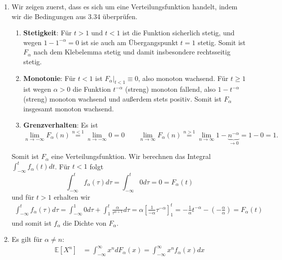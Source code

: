\documentclass{article}
\def\to{\ensuremath{\rightarrow}} %
\begin{document}
\begin{enumerate}[label=(\alph*)]
	\item Wir zeigen zuerst, dass es sich um eine Verteilungsfunktion handelt, indem wir die Bedingungen aus 3.34 überprüfen.
	      \begin{enumerate}
		      \item \textbf{Stetigkeit}: Für $t > 1$ und $t < 1$ ist die Funktion sicherlich stetig, und wegen $1 - 1^{-\alpha}=0$ ist sie auch am Übergangspunkt $t = 1$ stetig. Somit ist $F_\alpha$ nach dem Klebelemma stetig und damit insbesondere rechtsseitig stetig.
		      \item \textbf{Monotonie}: Für $t < 1$ ist $F_\alpha|_{t < 1} \equiv 0$, also monoton wachsend. Für $t \geq 1$ ist wegen $\alpha > 0$ die Funktion $t^{-\alpha}$ (streng) monoton fallend, also $1 - t^{-\alpha}$ (streng) monoton wachsend und außerdem stets positiv. Somit ist $F_\alpha$ insgesamt monoton wachsend.
		      \item \textbf{Grenzverhalten}: Es ist
		            \begin{equation*}
			            \lim_{n \to -\infty} F_\alpha(n) \overset{n < 1}{=} \lim_{n \to -\infty} 0 = 0 \qquad \lim_{n \to \infty} F_\alpha(n) \overset{n > 1}{=} \lim_{n \to \infty} 1 - \underbrace{n^{-\alpha}}_{\to 0} = 1 - 0 = 1\text{.}
		            \end{equation*}
	      \end{enumerate}
	      Somit ist $F_\alpha$ eine Verteilungsfunktion. Wir berechnen das Integral $\int_{-\infty}^{t} f_\alpha(t) dt$. Für $t < 1$ folgt
	      \begin{equation*}
		      \int_{-\infty}^{t} f_\alpha(\tau) d\tau = \int_{-\infty}^{t} 0 d\tau = 0 = F_\alpha(t)
	      \end{equation*}
	      und für $t > 1$ erhalten wir
	      \begin{align*}
		      \int_{-\infty}^{t} f_\alpha(\tau) d\tau = \int_{-\infty}^{1} 0 d\tau + \int_{1}^{t} \frac{\alpha}{\tau^{\alpha + 1}} d\tau = \alpha \left[\frac{1}{-\alpha} \tau^{-\alpha}\right]_1^t = - \frac{1}{\alpha} t^{-\alpha} - \left( - \frac{\alpha}{\alpha} \right) = F_\alpha(t)
	      \end{align*}
	      und somit ist $f_\alpha$ die Dichte von $F_\alpha$.
	\item Es gilt für $\alpha \neq n$:
	      \begin{align*}
		      \mathds{E}[X^n] & = \int_{-\infty}^{\infty} x^n dF_\alpha(x) = \int_{-\infty}^{\infty} x^n f_\alpha(x) dx                                                                                             \\

\end{align*}
\end{enumerate}
\end{document}
